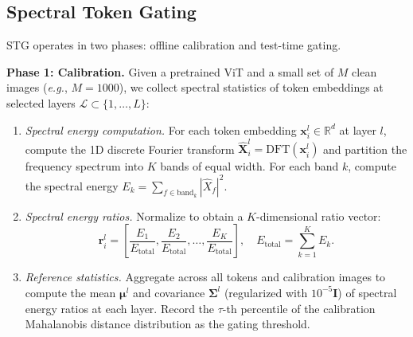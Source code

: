 \documentclass{article}
\newcommand{\methodname}{STG}
\newcommand{\eg}{\emph{e.g.}}
\begin{document}
\subsection{Spectral Token Gating}

\methodname{} operates in two phases: offline calibration and test-time gating.

\textbf{Phase 1: Calibration.} Given a pretrained ViT and a small set of $M$ clean images (\eg, $M{=}1000$), we collect spectral statistics of token embeddings at selected layers $\mathcal{L} \subset \{1, \ldots, L\}$:

\begin{enumerate}
    \item \emph{Spectral energy computation.} For each token embedding $\mathbf{x}_i^l \in \mathbb{R}^d$ at layer $l$, compute the 1D discrete Fourier transform $\hat{\mathbf{X}}_i^l = \text{DFT}(\mathbf{x}_i^l)$ and partition the frequency spectrum into $K$ bands of equal width. For each band $k$, compute the spectral energy $E_k = \sum_{f \in \text{band}_k} |\hat{X}_f|^2$.

    \item \emph{Spectral energy ratios.} Normalize to obtain a $K$-dimensional ratio vector:
    \begin{equation}
        \mathbf{r}_i^l = \left[\frac{E_1}{E_\text{total}}, \frac{E_2}{E_\text{total}}, \ldots, \frac{E_K}{E_\text{total}}\right], \quad E_\text{total} = \sum_{k=1}^K E_k.
    \end{equation}

    \item \emph{Reference statistics.} Aggregate across all tokens and calibration images to compute the mean $\boldsymbol{\mu}^l$ and covariance $\boldsymbol{\Sigma}^l$ (regularized with $10^{-5}\mathbf{I}$) of spectral energy ratios at each layer. Record the $\tau$-th percentile of the calibration Mahalanobis distance distribution as the gating threshold.
\end{enumerate}
\end{document}
